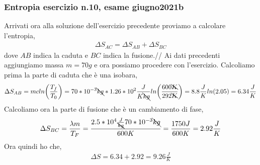         \subsubsection{Entropia esercizio n.10, esame giugno2021b}
            Arrivati ora alla soluzione dell'esercizio precedente proviamo a calcolare l'entropia,
            \begin{align*}
                \Delta S_{AC} = \Delta S_{AB} + \Delta S_{BC}
            \end{align*}
            dove $AB$ indica la caduta e $BC$ indica la fusione.//
            Ai dati precedenti aggiungiamo massa $m=70g$ e ora possiamo procedere con l'esercizio. Calcoliamo prima la parte di caduta che è una isobara,
            \begin{align*}
                \Delta S_{AB} = mcln\bigg(\frac{T_f}{T_0}\bigg)=70*10^{-3}\bcancel{kg}*1.26*10^2\frac{J}{K\bcancel{kg}}ln\bigg(\frac{600\bcancel{K}}{292 \bcancel{K}}\bigg)= 8.8\frac{J}{K}ln(2.05)=6.34\frac{J}{K}
            \end{align*}
            Calcoliamo ora la parte di fusione che è un cambiamento di fase,
            \begin{align*}
                \Delta S_{BC} = \frac{\lambda m}{T_F} = \frac{2.5*10^4\frac{J}{\bcancel{kg}}70*10^{-3}\bcancel{kg}}{600K} = \frac{1750J}{600K} = 2.92\frac{J}{K}
            \end{align*}
            Ora quindi ho che,
            \begin{align*}
                \Delta S = 6.34 + 2.92 = 9.26\frac{J}{K}
            \end{align*}
